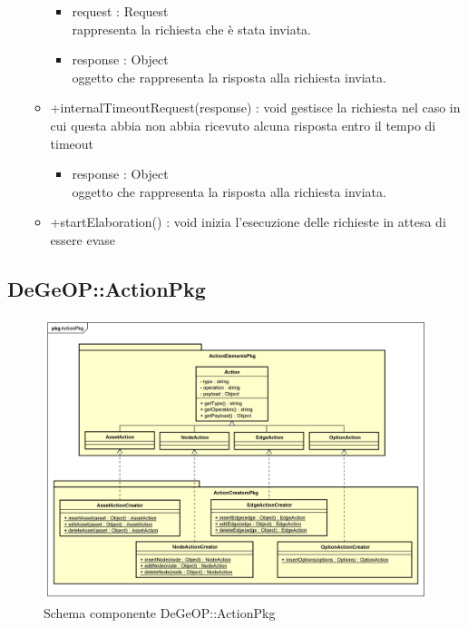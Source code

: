 \begin{itemize}
\begin{itemize}
\begin{itemize}
			\item request : Request\\
			rappresenta la richiesta che è stata inviata.
			\item response : Object\\
			oggetto che rappresenta la risposta alla richiesta inviata.
		\end{itemize}
		\item +internalTimeoutRequest(response) : void\newline
		gestisce la richiesta nel caso in cui questa abbia non abbia ricevuto alcuna risposta entro il tempo di timeout
		\begin{itemize}
			\item response : Object\\
			oggetto che rappresenta la risposta alla richiesta inviata.
		\end{itemize}
		\item +startElaboration() : void\newline
		inizia l'esecuzione delle richieste in attesa di essere evase
	\end{itemize}
\end{itemize}
\newpage
\subsection{DeGeOP::ActionPkg}
\label{pkg::ActionPkg}
\begin{figure}[H]
	\centering
	\includegraphics[width=\textwidth]{img/PkgDiagram/ActionPkg.png}
	\caption{Schema componente DeGeOP::ActionPkg}
\end{figure}
